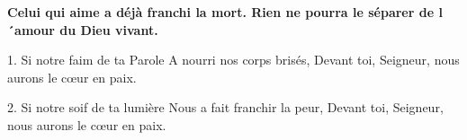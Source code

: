 \textbf{
Celui qui aime a déjà franchi la mort.
Rien ne pourra le séparer de l´amour du Dieu vivant.
}

1.
Si notre faim de ta Parole
A nourri nos corps brisés,
Devant toi, Seigneur, nous aurons le cœur en paix.

2.
Si notre soif de ta lumière
Nous a fait franchir la peur,
Devant toi, Seigneur, nous aurons le cœur en paix.


